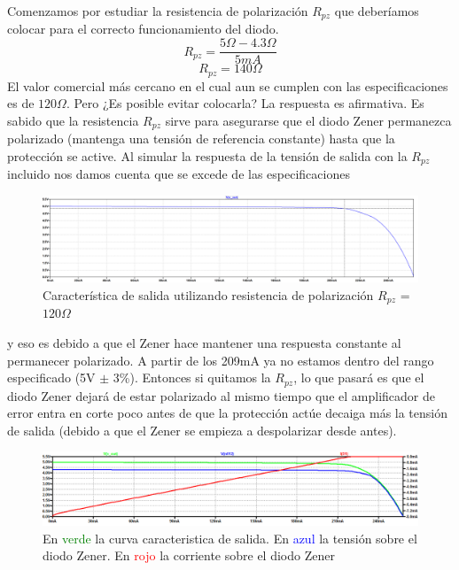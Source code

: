 Comenzamos por estudiar la resistencia de polarización $R_{pz}$ que deberíamos colocar para el correcto funcionamiento del diodo.
\begin{equation}
	R_{pz} = \frac{5\Omega-4.3\Omega}{5mA}
\end{equation}
\begin{equation}
R_{pz} = 140 \Omega
\end{equation}
El valor comercial más cercano en el cual aun se cumplen con las especificaciones es de $120\Omega$.
Pero ¿Es posible evitar colocarla? La respuesta es afirmativa.
Es sabido que la resistencia $R_{pz}$ sirve para asegurarse que el diodo Zener
permanezca polarizado (mantenga una tensión de referencia constante) hasta 
que la protección se active. Al simular la respuesta de la tensión de 
salida con la $R_{pz}$ incluido nos damos cuenta que se excede de las especificaciones 
\begin{figure}[H]
	\centering
	\includegraphics[width=\linewidth]{ImagenesEjercicio1/ConRpz}
	\caption{Característica de salida utilizando resistencia de polarización $R_{pz}$ = $120\Omega$}
	\label{fig:conrpz}
\end{figure}

 y eso es debido a que el Zener hace mantener una respuesta constante
al permanecer polarizado. A partir de los 209mA ya no estamos dentro del rango especificado
(5V $\pm$ 3\%). Entonces si quitamos la $R_{pz}$, lo que pasará es que el diodo Zener dejará de estar polarizado
al mismo tiempo que el amplificador de error entra en corte poco antes de que la protección actúe
decaiga más la tensión de salida (debido a que el Zener se empieza a despolarizar desde antes).

\begin{figure}[H]
	\centering
	\includegraphics[width=\linewidth]{ImagenesEjercicio1/SinRpz3curvas}
	\caption{En \textcolor{green}{verde} la curva caracteristica de salida. En \textcolor{blue}{azul} la tensión sobre el diodo Zener. En \textcolor{red}{rojo} la corriente sobre el diodo Zener}
	\label{fig:sinrpz3curvas}
\end{figure}

